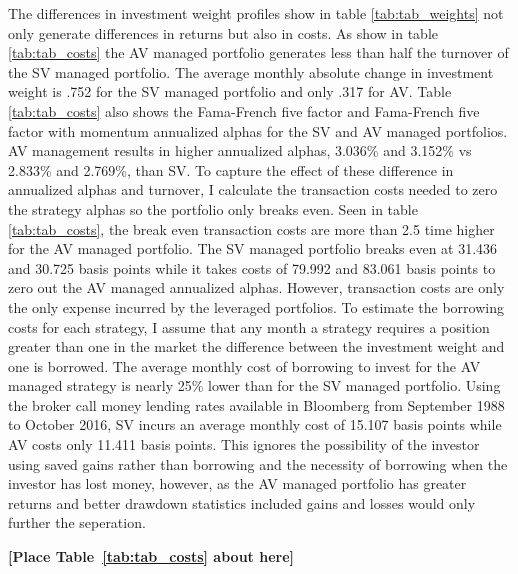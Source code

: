 The differences in investment weight profiles show in table \ref{tab:tab_weights} not only generate differences in returns but also in costs. As show in table \ref{tab:tab_costs} the AV managed portfolio generates less than half the turnover of the SV managed portfolio. The average monthly absolute change in investment weight is .752 for the SV managed portfolio and only .317 for AV. Table \ref{tab:tab_costs} also shows the Fama-French five factor and Fama-French five factor with momentum annualized alphas for the SV and AV managed portfolios. AV management results in higher annualized alphas, 3.036\% and 3.152\% vs 2.833\% and 2.769\%, than SV. To capture the effect of these difference in annualized alphas and turnover, I calculate the transaction costs needed to zero the strategy alphas so the portfolio only breaks even. \citep{frazzini_trading_2015,moreira_volatility-managed_2017} Seen in table \ref{tab:tab_costs}, the break even transaction costs are more than 2.5 time higher for the AV managed portfolio. The SV managed portfolio breaks even at 31.436 and 30.725 basis points while it takes costs of 79.992 and 83.061 basis points to zero out the AV managed annualized alphas. However, transaction costs are only the only expense incurred by the leveraged portfolios. To estimate the borrowing costs for each strategy, I assume that any month a strategy requires a position greater than one in the market the difference between the investment weight and one is borrowed. The average monthly cost of borrowing to invest for the AV managed strategy is nearly 25\% lower than for the SV managed portfolio. Using the broker call money lending rates available in Bloomberg from September 1988 to October 2016, SV incurs an average monthly cost of 15.107 basis points while AV costs only 11.411 basis points. This ignores the possibility of the investor using saved gains rather than borrowing and the necessity of borrowing when the investor has lost money, however, as the AV managed portfolio has greater returns and better drawdown statistics included gains and losses would only further the seperation.
\bigskip
\centerline{\bf [Place Table~\ref{tab:tab_costs} about here]}
\bigskip